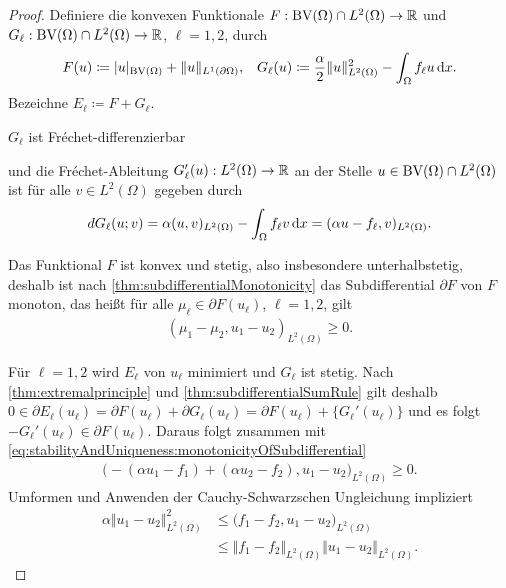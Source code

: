 \begin{proof}
  Definiere die konvexen Funktionale $F:\textup{BV}(\Omega)\cap L^2(\Omega)\to \mathbb{R}$
  und 
  $G_\ell:\textup{BV}(\Omega)\cap L^2(\Omega)\to \mathbb{R}$, $\ell=1,2$, durch
  \begin{align*}
    F(u) &\coloneqq |u|_{\textup{BV}(\Omega)} + \Vert u \Vert_{L^1(\partial\Omega)},&
    G_\ell(u)\coloneqq \frac{\alpha}{2}\Vert u\Vert_{L^2(\Omega)}^2 -
    \int_\Omega f_\ell u\,\mathrm{d}x.
  \end{align*}
  Bezeichne $E_\ell\coloneqq F+G_\ell$.

  $G_\ell$ ist Fr\'echet-differenzierbar 


  und die Fr\'echet-Ableitung $G_\ell'(u):
  L^2(\Omega)\to\mathbb{R}$ an der
  Stelle
  $u\in \textup{BV}(\Omega)\cap L^2(\Omega)$ ist 
  für alle $v\in L^2(\Omega)$ gegeben durch
  \begin{align*}
    dG_\ell(u;v) = \alpha (u,v)_{L^2(\Omega)} - \int_\Omega f_\ell v\,\mathrm{d}x 
    = (\alpha u-f_\ell ,v)_{L^2(\Omega)}.
  \end{align*}

  Das Funktional $F$ ist konvex 
  und stetig, also insbesondere unterhalbstetig, deshalb 
  ist nach \cref{thm:subdifferentialMonotonicity} das
  Subdifferential
  $\partial F$ von $F$ monoton, das heißt für alle $\mu_\ell\in \partial
  F(u_\ell)$, $\ell=1,2$, gilt
  \begin{align}\label{eq:stabilityAndUniqueness:monotonicityOfSubdifferential}
    (\mu_1-\mu_2,u_1-u_2)_{L^2(\Omega)}\geq 0.
  \end{align}

  Für $\ell=1,2$ wird $E_\ell$ von $u_\ell$ minimiert und $G_\ell$ ist stetig.
  Nach \cref{thm:extremalprinciple} und
  \cref{thm:subdifferentialSumRule} gilt deshalb $0\in\partial E_\ell(u_\ell)
  = \partial F(u_\ell)+\partial G_\ell(u_\ell)=\partial F(u_\ell)+
  \{G_\ell'(u_\ell)\}$ 
  und es folgt
  $-G_\ell'(u_\ell)\in\partial F(u_\ell)$.
  Daraus folgt zusammen mit
  \eqref{eq:stabilityAndUniqueness:monotonicityOfSubdifferential}
  \begin{align*}
    \big( -(\alpha u_1 - f_1) + (\alpha u_2 - f_2), u_1 - u_2\big)_{L^2(\Omega)}
    \geq 0.
  \end{align*}
  Umformen und Anwenden der Cauchy-Schwarzschen Ungleichung impliziert
  \begin{align*}
    \alpha \Vert u_1 - u_2 \Vert_{L^2(\Omega)}^2
    &\leq
    \big(f_1 -f_2, u_1-u_2 \big)_{L^2(\Omega)}\\
    &\leq
    \Vert f_1-f_2\Vert_{L^2(\Omega)}\Vert u_1 - u_2\Vert_{L^2(\Omega)}.
  \end{align*}


\end{proof}
